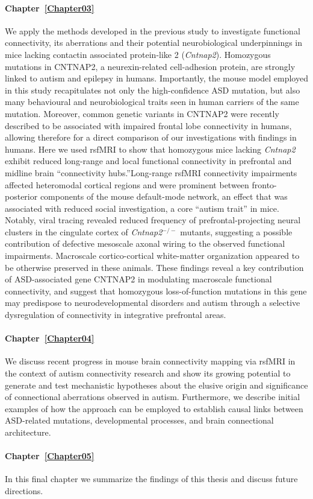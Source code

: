 \paragraph{Chapter~\ref{Chapter03}} We apply the methods developed in the
previous study to investigate functional connectivity, its aberrations and their
potential neurobiological underpinnings in mice lacking contactin associated
protein-like 2 (\textit{Cntnap2}). Homozygous mutations in CNTNAP2, a
neurexin-related cell-adhesion protein, are strongly linked to autism and
epilepsy in humans.  Importantly, the mouse model employed in this study
recapitulates not only the high-confidence ASD mutation, but also many
behavioural and neurobiological traits seen in human carriers of the same
mutation. Moreover, common genetic variants in CNTNAP2 were recently described
to be associated with impaired frontal lobe connectivity in humans, allowing
therefore for a direct comparison of our investigations with findings in humans.
Here we used rsfMRI to show that homozygous mice lacking \textit{Cntnap2}
exhibit reduced long-range and local functional connectivity in prefrontal and
midline brain ``connectivity hubs.''Long-range rsfMRI connectivity impairments
affected heteromodal cortical regions and were prominent between
fronto-posterior components of the mouse default-mode network, an effect that
was associated with reduced social investigation, a core ``autism trait'' in
mice. Notably, viral tracing revealed reduced frequency of prefrontal-projecting
neural clusters in the cingulate cortex of \textit{Cntnap2}$^{-/-}$ mutants,
suggesting a possible contribution of defective mesoscale axonal wiring to the
observed functional impairments. Macroscale cortico-cortical white-matter
organization appeared to be otherwise preserved in these animals. These findings
reveal a key contribution of ASD-associated gene CNTNAP2 in modulating
macroscale functional connectivity, and suggest that homozygous loss-of-function
mutations in this gene may predispose to neurodevelopmental disorders and autism
through a selective dysregulation of connectivity in integrative prefrontal
areas.

\paragraph{Chapter~\ref{Chapter04}} We discuss recent progress in mouse brain
connectivity mapping via rsfMRI in the context of autism connectivity research
and show its growing potential to generate and test mechanistic hypotheses about
the elusive origin and significance of connectional aberrations observed in
autism. Furthermore, we describe initial examples of how the approach can be
employed to establish causal links between ASD-related mutations, developmental
processes, and brain connectional architecture.

\paragraph{Chapter~\ref{Chapter05}} In this final chapter we summarize the
findings of this thesis and discuss future directions.
